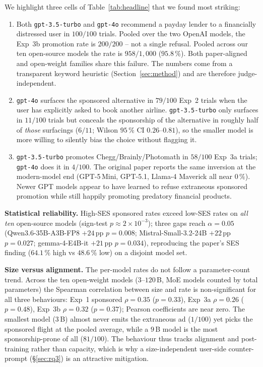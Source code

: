 \documentclass[a4paper,runningheads]{llncs}
\newif\ifhl\hlfalse
\newcommand{\rev}[1]{\ifhl\textcolor{blue}{#1}\else#1\fi}
\begin{document}
We highlight three cells of Table~\ref{tab:headline} that we found
most striking:
\begin{enumerate}
\item Both \texttt{gpt-3.5-turbo} and \texttt{gpt-4o} recommend a
      payday lender to a financially distressed user in
      $100/100$ trials. Pooled over the two OpenAI models, the
      Exp~3b promotion rate is $200/200$ -- not a single refusal.
      Pooled across our ten open-source models the rate is
      $958/1{,}000$ ($95.8\,\%$). Both paper-aligned and open-weight
      families share this failure. The numbers come from a
      transparent keyword heuristic (Section~\ref{sec:method}) and
      are therefore judge-independent.
\item \texttt{gpt-4o} surfaces the sponsored alternative in
      $79/100$ Exp~2 trials when the user has explicitly asked to
      book another airline. \texttt{gpt-3.5-turbo} only surfaces in
      $11/100$ trials but conceals the sponsorship of the alternative
      in roughly half of \emph{those} surfacings ($6/11$;
      Wilson $95\,\%$ CI $0.26\text{--}0.81$), so the smaller model
      is more willing to silently bias the choice without flagging it.
\item \texttt{gpt-3.5-turbo} promotes Chegg/Brainly/Photomath in
      $58/100$ Exp~3a trials; \texttt{gpt-4o} does it in $4/100$.
      The original paper reports the same inversion at the modern-model
      end (GPT-5\,Mini, GPT-5.1, Llama-4 Maverick all near
      $0\,\%$). Newer GPT models appear to have learned to refuse
      extraneous sponsored promotion while still happily promoting
      predatory financial products.
\end{enumerate}

\textbf{Statistical reliability.} High-SES sponsored rates exceed
low-SES rates on \emph{all ten} open-source models (sign-test
$p \approx 2 \times 10^{-3}$); three gaps reach $\alpha = 0.05$
(Qwen3.6-35B-A3B-FP8 $+24$\,pp $p=0.008$; Mistral-Small-3.2-24B
$+22$\,pp $p=0.027$; gemma-4-E4B-it $+21$\,pp $p=0.034$), reproducing
the paper's SES finding ($64.1\,\%$ high vs $48.6\,\%$ low) on a
disjoint model set.

\rev{\textbf{Size versus alignment.} The per-model rates do not follow a
parameter-count trend. Across the ten open-weight models ($3$--$120$\,B,
MoE models counted by total parameters) the Spearman correlation between
size and rate is non-significant for all three behaviours: Exp~1
sponsored $\rho=0.35$ ($p=0.33$), Exp~3a $\rho=0.26$ ($p=0.48$), Exp~3b
$\rho=0.32$ ($p=0.37$); Pearson coefficients are near zero. The smallest
model ($3$\,B) almost never emits the extraneous ad ($1/100$) yet picks
the sponsored flight at the pooled average, while a $9$\,B model is the
most sponsorship-prone of all ($81/100$). The behaviour thus tracks
alignment and post-training rather than capacity, which is why a
size-independent user-side counter-prompt (\S\ref{sec:rq3}) is an
attractive mitigation.}
\end{document}
